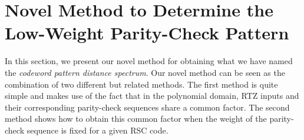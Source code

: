 \section{Novel Method to Determine the Low-Weight Parity-Check Pattern}
\label{sec3}
In this section, we present our novel method for obtaining what we have named the \textit{codeword pattern distance spectrum}. %
Our novel method can be seen as the combination of two different but related methods. The first method is quite simple and makes use of the fact that in the polynomial domain, RTZ inputs and their corresponding parity-check sequences share a common factor. 
The second method shows how to obtain this common factor when the weight of the parity-check sequence is fixed for a given RSC code. 





\newpage







